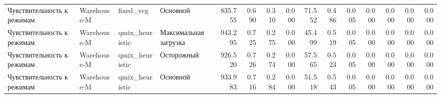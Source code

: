 \begin{tabular}{llllrrrrrrrrrrr}
 Чувствительность к режимам & Warehouse-M & fixed_vcg & Основной & 835.755 & 0.690 & 0.310 & 0.000 & 71.552 & 0.486 & 0.005 & 0.000 & 0.000 & 0.000 & 0.000 \\
 Чувствительность к режимам & Warehouse-M & qmix_heuristic & Максимальная загрузка & 943.295 & 0.725 & 0.275 & 0.000 & 45.499 & 0.519 & 0.005 & 0.000 & 0.000 & 0.000 & 0.000 \\
 Чувствительность к режимам & Warehouse-M & qmix_heuristic & Осторожный & 926.520 & 0.726 & 0.274 & 0.000 & 57.565 & 0.523 & 0.005 & 0.000 & 0.000 & 0.000 & 0.000 \\
 Чувствительность к режимам & Warehouse-M & qmix_heuristic & Основной & 933.983 & 0.716 & 0.284 & 0.000 & 51.518 & 0.543 & 0.005 & 0.000 & 0.000 & 0.000 & 0.000 \\
\bottomrule
\end{tabular}
